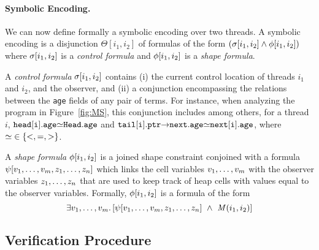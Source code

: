 \paragraph{Symbolic Encoding.}
We can now define formally a symbolic encoding over two threads. %
A symbolic encoding is a disjunction $\Theta[i_1,i_2]$ of formulas of
the form $(\sigma[i_1,i_2] \land \phi[i_1,i_2])$ where
$\sigma[i_1,i_2]$ is a {\em control formula} and
$\phi[i_1,i_2]$ is a {\em shape formula}.
%

A {\em control formula} $\sigma[i_1,i_2]$ contains %
(i) the current control location of threads $i_1$ and $i_2$, and the
observer, and %
(ii) a conjunction encompassing the relations between the {\tt age}
fields of any pair of terms.
%
For instance, when analyzing the program in Figure~\ref{fig:MS}, %
this conjunction includes among others, for a thread $i$, %
${\tt head[i].age}{\simeq}{\tt Head.age}$ %
and %
${\tt tail[i].ptr{\to}next.age}{\simeq}{\tt next[i].age}$, %
where ${\simeq}\in\left\{<,=,>\right\}$. %

A {\em shape formula} $\phi[i_1,i_2]$ is a joined
shape constraint %
conjoined with a formula $\psi[v_1 ,\ldots , v_m,z_1, \ldots,
z_n]$ which links the cell variables $v_1,\ldots,v_m$
with the observer variables $z_1, \ldots, z_n$ that are used
to keep track of heap cells with values equal to the observer
variables. %
Formally, $\phi[i_1,i_2]$ is a formula of the form %
$$\exists
\cvar_1 ,\ldots , \cvar_m . \left[ %
  \psi[v_1 ,\ldots , v_m,\obvar_1, \ldots, \obvar_n]%
  \ \land \ %
  \matrixrep(i_1,i_2)%
\right]$$
%
%

\subsection{Verification Procedure}

